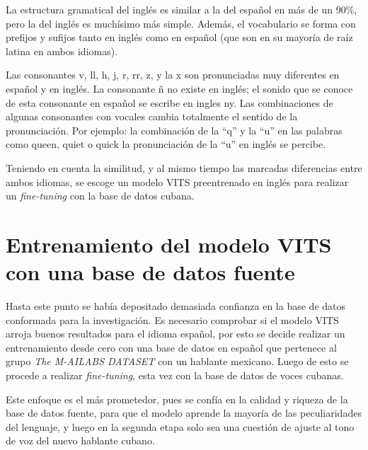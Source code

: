 La estructura gramatical del inglés es similar a la del español en más de un 90$\%$, pero la del inglés es muchísimo más simple. Además, el vocabulario se forma con prefijos y sufijos tanto en inglés como en español (que son en su mayoría de raíz latina en ambos idiomas).

Las consonantes v, ll, h, j, r, rr, z, y  la x son pronunciadas muy diferentes en español y en inglés. La consonante ñ no existe en inglés; el sonido que se conoce de esta consonante en español se escribe en ingles ny. Las combinaciones de algunas consonantes con vocales cambia totalmente el sentido de la pronunciación. Por ejemplo: la combinación de la “q” y la “u” en las palabras como queen, quiet o quick la pronunciación de  la “u” en inglés se percibe.

Teniendo en cuenta la similitud, y al mismo tiempo las marcadas diferencias entre ambos idiomas, se escoge un modelo VITS preentrenado en inglés para realizar un \textit{fine-tuning} con la base de datos cubana.


\section{Entrenamiento del modelo VITS con una base de datos fuente} \label{angelina}

Hasta este punto se había depositado demasiada confianza en la base de datos conformada para la investigación. Es necesario comprobar si el modelo VITS arroja buenos resultados para el idioma español, por esto se decide realizar un entrenamiento desde cero con una base de datos en español que pertenece al grupo \textit{The M-AILABS DATASET} con un hablante mexicano. Luego de esto se procede a realizar \textit{fine-tuning}, esta vez con la base de datos de voces cubanas. 

Este enfoque es el más prometedor, pues se confía en la calidad y riqueza de la base de datos fuente, para que el modelo aprende la mayoría de las peculiaridades del lenguaje, y luego en la segunda etapa solo sea una cuestión de ajuste al tono de voz del nuevo hablante cubano.